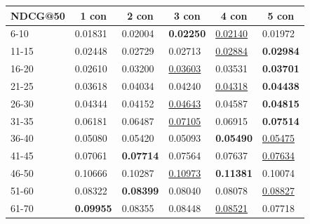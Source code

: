 \begin{table}[]
    \centering
    \begin{tabular}{|l|l|l|l|l|l|}
        \hline
        NDCG@50 & \multicolumn{1}{c|}{1 con} & \multicolumn{1}{c|}{2 con} & \multicolumn{1}{c|}{3 con} & \multicolumn{1}{c|}{4 con} & \multicolumn{1}{c|}{5 con} \\ \hline
        6-10    & 0.01831                    & 0.02004                    & \textbf{0.02250}           & \underline{0.02140}        & 0.01972                    \\ \hline
        11-15   & 0.02448                    & 0.02729                    & 0.02713                    & \underline{0.02884}        & \textbf{0.02984}           \\ \hline
        16-20   & 0.02610                    & 0.03200                    & \underline{0.03603}        & 0.03531                    & \textbf{0.03701}           \\ \hline
        21-25   & 0.03618                    & 0.04034                    & 0.04240                    & \underline{0.04318}        & \textbf{0.04438}           \\ \hline
        26-30   & 0.04344                    & 0.04152                    & \underline{0.04643}        & 0.04587                    & \textbf{0.04815}           \\ \hline
        31-35   & 0.06181                    & 0.06487                    & \underline{0.07105}        & 0.06915                    & \textbf{0.07514}           \\ \hline
        36-40   & 0.05080                    & 0.05420                    & 0.05093                    & \textbf{0.05490}           & \underline{0.05475}        \\ \hline
        41-45   & 0.07061                    & \textbf{0.07714}           & 0.07564                    & 0.07637                    & \underline{0.07634}        \\ \hline
        46-50   & 0.10666                    & 0.10287                    & \underline{0.10973}        & \textbf{0.11381}           & 0.10074                    \\ \hline
        51-60   & 0.08322                    & \textbf{0.08399}           & 0.08040                    & 0.08078                    & \underline{0.08827}        \\ \hline
        61-70   & \textbf{0.09955}           & 0.08355                    & 0.08448                    & \underline{0.08521}        & 0.07718                    \\ \hline

\end{tabular}
\end{table}
